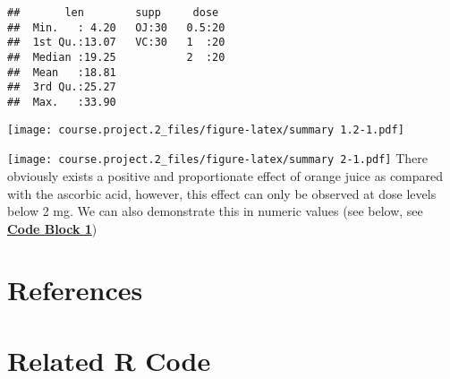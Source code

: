 \documentclass[]{article}
\newenvironment{Shaded}{}{}
\newcommand{\KeywordTok}[1]{\textcolor[rgb]{0.00,0.00,1.00}{{#1}}}
\newcommand{\StringTok}[1]{\textcolor[rgb]{0.00,0.50,0.50}{{#1}}}
\newcommand{\NormalTok}[1]{{#1}}
\begin{document}
\begin{verbatim}
##       len        supp     dose   
##  Min.   : 4.20   OJ:30   0.5:20  
##  1st Qu.:13.07   VC:30   1  :20  
##  Median :19.25           2  :20  
##  Mean   :18.81                   
##  3rd Qu.:25.27                   
##  Max.   :33.90
\end{verbatim}

\texttt{[image: course.project.2\_files/figure-latex/summary 1.2-1.pdf]}

\texttt{[image: course.project.2\_files/figure-latex/summary 2-1.pdf]}
There obviously exists a positive and proportionate effect of orange
juice as compared with the ascorbic acid, however, this effect can only
be observed at dose levels below 2 mg. We can also demonstrate this in
numeric values (see below, see \textbf{\hyperref[code-block-1]{Code
Block 1}})

\begin{Shaded}
\end{Shaded}

\section{References}\label{references}

\section{Related R Code}\label{related-r-code}

\end{document}
